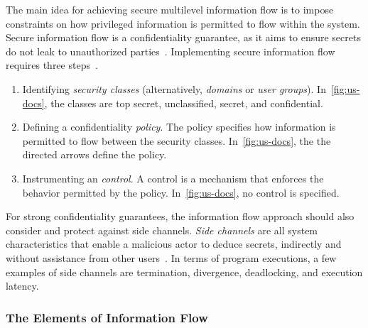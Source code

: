 The main idea for achieving secure multilevel information flow is to impose constraints on how privileged information is permitted to flow within the system.
Secure information flow is a confidentiality guarantee, as it aims to ensure secrets do not leak to unauthorized parties~\cite{piessens2024}.
Implementing secure information flow requires three steps~\cite{eggert2014}.

\begin{enumerate} 

\item Identifying \emph{security classes} (alternatively, \emph{domains} or \emph{user groups}).
In~\autoref{fig:us-docs}, the classes are top secret, unclassified, secret, and confidential.

\item Defining a confidentiality \emph{policy}.
The policy specifies how information is permitted to flow between the security classes.
In~\autoref{fig:us-docs}, the the directed arrows define the policy.

\item Instrumenting an \emph{control}. 
A control is a mechanism that enforces the behavior permitted by the policy.
In~\autoref{fig:us-docs}, no control is specified.

\end{enumerate}

For strong confidentiality guarantees, the information flow approach should also consider and protect against side channels.
\emph{Side channels} are all system characteristics that enable a malicious actor to deduce secrets,
indirectly and without assistance from other users~\cite[p. 280]{bishop2003}.
In terms of program executions, a few examples of side channels are termination, divergence, deadlocking, and execution latency.
 
\subsubsection{The Elements of Information Flow}
\label{if-elements}

